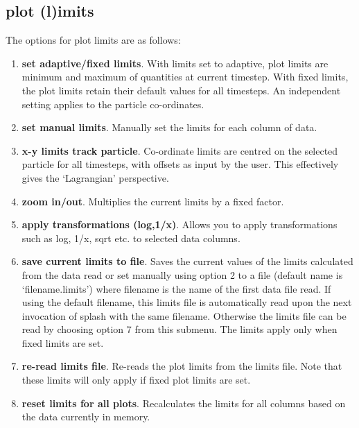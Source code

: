 \documentclass[a4paper,11pt]{article}
\begin{document}
\subsection{plot (l)imits}
\label{sec:optionslimits}
 The options for plot limits are as follows:
\begin{enumerate}
\item \textbf{set adaptive/fixed limits}. With limits set to adaptive, plot
limits are minimum and maximum of quantities at current
timestep. With fixed limits, the plot limits retain their default values
for all timesteps. An independent setting applies to the particle co-ordinates.
\item \textbf{set manual limits}. Manually set the limits for each column of
data.
\item \textbf{x-y limits track particle}. Co-ordinate limits are centred on the
selected particle for all timesteps, with offsets as input by the user. This
effectively gives the `Lagrangian' perspective.
\item \textbf{zoom in/out}. Multiplies the current limits by a fixed factor.
\item \textbf{apply transformations (log,1/x)}. Allows you to apply transformations such as log, 1/x, sqrt
etc. to selected data columns.
\item \textbf{save current limits to file}. Saves the current values of the
limits calculated from the data read or set manually using option 2 to a
file (default name is `filename.limits') where filename is the name of the first data file
read. If using the default filename, this limits file is automatically read upon the next
invocation of splash with the same filename.
Otherwise the limits file can be read by choosing option 7 from this submenu. The limits apply
only when fixed limits are set.
\item \textbf{re-read limits file}. Re-reads the plot limits from the
limits file. Note that these limits will only apply if fixed plot limits are set.
\item \textbf{reset limits for all plots}. Recalculates the limits for all columns based on
the data currently in memory.
\end{enumerate}
\end{document}
